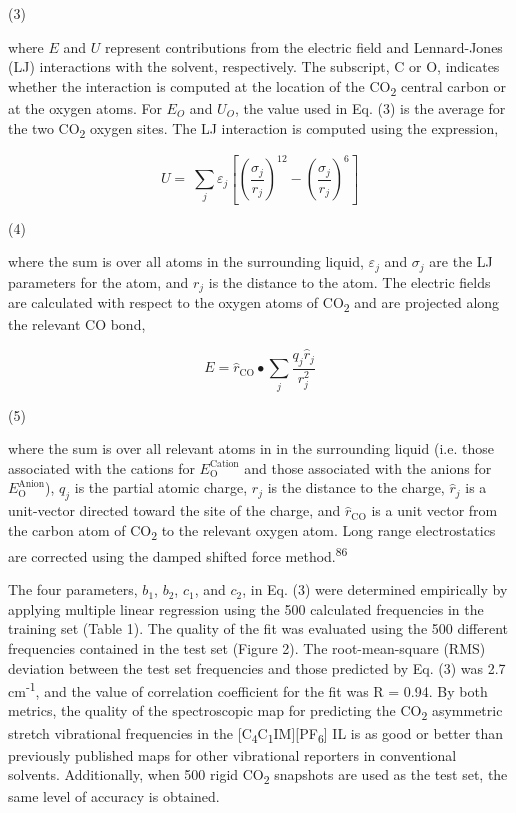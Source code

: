 \documentclass[]{article}
\begin{document}
(3)

where \(E\) and \(U\) represent contributions from the electric field
and Lennard-Jones (LJ) interactions with the solvent, respectively. The
subscript, C or O, indicates whether the interaction is computed at the
location of the CO\textsubscript{2} central carbon or at the oxygen
atoms. For \(E_{O}\) and \(U_{O}\), the value used in Eq. (3) is the
average for the two CO\textsubscript{2} oxygen sites. The LJ interaction
is computed using the expression,

\[U = \ \sum_{j}^{}\varepsilon_{j}\left\lbrack \left( \frac{\sigma_{j}}{r_{j}} \right)^{12} - \left( \frac{\sigma_{j}}{r_{j}} \right)^{6} \right\rbrack\]

(4)

where the sum is over all atoms in the surrounding liquid,
\(\varepsilon_{j}\) and \(\sigma_{j}\) are the LJ parameters for the
atom, and \(r_{j}\) is the distance to the atom. The electric fields are
calculated with respect to the oxygen atoms of CO\textsubscript{2} and
are projected along the relevant CO bond,

\[E = {\widehat{r}}_{\mathrm{\text{CO}}} \bullet \sum_{j}^{}\frac{q_{j}{\widehat{r}}_{j}}{r_{j}^{2}}\]

(5)

where the sum is over all relevant atoms in in the surrounding liquid
(i.e. those associated with the cations for
\(E_{\mathrm{O}}^{\text{Cation}}\) and those associated with the anions
for \(E_{\mathrm{O}}^{\text{Anion}}\)), \(q_{j}\) is the partial atomic
charge, \(r_{j}\) is the distance to the charge, \({\widehat{r}}_{j}\)
is a unit-vector directed toward the site of the charge, and
\({\widehat{r}}_{\mathrm{\text{CO}}}\) is a unit vector from the carbon
atom of CO\textsubscript{2} to the relevant oxygen atom. Long range
electrostatics are corrected using the damped shifted force
method.\textsuperscript{86}

The four parameters, \(b_{1}\), \(b_{2}\), \(c_{1}\), and \(c_{2}\), in
Eq. (3) were determined empirically by applying multiple linear
regression using the 500 calculated frequencies in the training set
(Table 1). The quality of the fit was evaluated using the 500 different
frequencies contained in the test set (Figure 2). The root-mean-square
(RMS) deviation between the test set frequencies and those predicted by
Eq. (3) was 2.7 cm\textsuperscript{-1}, and the value of correlation
coefficient for the fit was R = 0.94. By both metrics, the quality of
the spectroscopic map for predicting the CO\textsubscript{2} asymmetric
stretch vibrational frequencies in the
{[}C\textsubscript{4}C\textsubscript{1}IM{]}{[}PF\textsubscript{6}{]} IL
is as good or better than previously published maps for other
vibrational reporters in conventional solvents. Additionally, when 500
rigid CO\textsubscript{2} snapshots are used as the test set, the same
level of accuracy is obtained.
\end{document}
